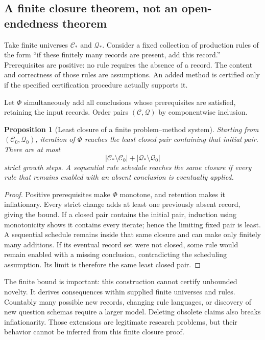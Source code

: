 \documentclass[11pt,letterpaper]{article}
\theoremstyle{plain}
\newtheorem{proposition}{Proposition}[section]
\theoremstyle{definition}
\theoremstyle{remark}
\begin{document}
\subsection{A finite closure theorem, not an open-endedness theorem}
Take finite universes $\mathcal C_*$ and $\mathcal Q_*$. Consider a fixed collection of production rules of the form ``if these finitely many records are present, add this record.'' Prerequisites are positive: no rule requires the absence of a record. The content and correctness of those rules are assumptions. An added method is certified only if the specified certification procedure actually supports it.

Let $\Phi$ simultaneously add all conclusions whose prerequisites are satisfied, retaining the input records. Order pairs $(\mathcal C,\mathcal Q)$ by componentwise inclusion.
\begin{proposition}[Least closure of a finite problem--method system]\label{prop:agendaclosure}
Starting from $(\mathcal C_0,\mathcal Q_0)$, iteration of $\Phi$ reaches the least closed pair containing that initial pair. There are at most
\[
|\mathcal C_*\setminus\mathcal C_0|+|\mathcal Q_*\setminus\mathcal Q_0|
\]
strict growth steps. A sequential rule schedule reaches the same closure if every rule that remains enabled with an absent conclusion is eventually applied.
\end{proposition}
\begin{proof}
Positive prerequisites make $\Phi$ monotone, and retention makes it inflationary. Every strict change adds at least one previously absent record, giving the bound. If a closed pair contains the initial pair, induction using monotonicity shows it contains every iterate; hence the limiting fixed pair is least. A sequential schedule remains inside that same closure and can make only finitely many additions. If its eventual record set were not closed, some rule would remain enabled with a missing conclusion, contradicting the scheduling assumption. Its limit is therefore the same least closed pair.
\end{proof}

The finite bound is important: this construction cannot certify unbounded novelty. It derives consequences within supplied finite universes and rules. Countably many possible new records, changing rule languages, or discovery of new question schemas require a larger model. Deleting obsolete claims also breaks inflationarity. Those extensions are legitimate research problems, but their behavior cannot be inferred from this finite closure proof.
\end{document}
